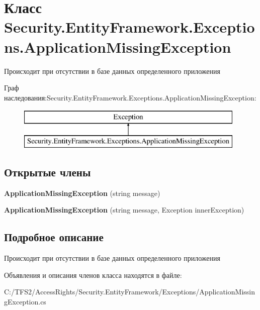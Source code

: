 \hypertarget{class_security_1_1_entity_framework_1_1_exceptions_1_1_application_missing_exception}{}\section{Класс Security.\+Entity\+Framework.\+Exceptions.\+Application\+Missing\+Exception}
\label{class_security_1_1_entity_framework_1_1_exceptions_1_1_application_missing_exception}


Происходит при отсутствии в базе данных определенного приложения  


Граф наследования\+:Security.\+Entity\+Framework.\+Exceptions.\+Application\+Missing\+Exception\+:\begin{figure}[H]
\begin{center}
\leavevmode
\includegraphics[height=2.000000cm]{dd/d99/class_security_1_1_entity_framework_1_1_exceptions_1_1_application_missing_exception}
\end{center}
\end{figure}
\subsection*{Открытые члены}
\begin{DoxyCompactItemize}
\item 
\mbox{\label{class_security_1_1_entity_framework_1_1_exceptions_1_1_application_missing_exception_a038f91e5adeed65c50e424fbd01da5f7}} 
{\bfseries Application\+Missing\+Exception} (string message)
\item 
\mbox{\label{class_security_1_1_entity_framework_1_1_exceptions_1_1_application_missing_exception_ae0013bbcf1a5278f3b778ba23eaab987}} 
{\bfseries Application\+Missing\+Exception} (string message, Exception inner\+Exception)
\end{DoxyCompactItemize}


\subsection{Подробное описание}
Происходит при отсутствии в базе данных определенного приложения 



Объявления и описания членов класса находятся в файле\+:\begin{DoxyCompactItemize}
\item 
C\+:/\+T\+F\+S2/\+Access\+Rights/\+Security.\+Entity\+Framework/\+Exceptions/Application\+Missing\+Exception.\+cs\end{DoxyCompactItemize}
